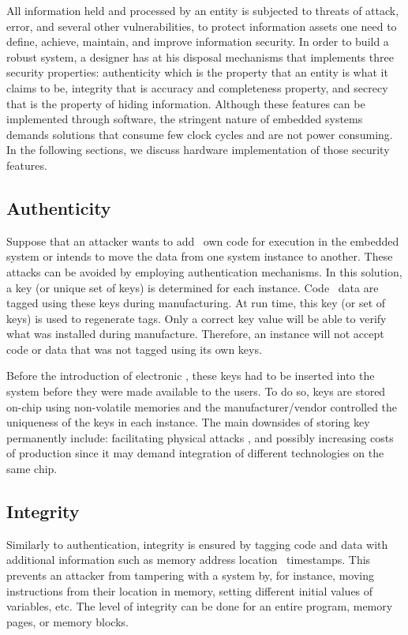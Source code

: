All information held and processed by an entity is subjected to threats of attack, error, and several other vulnerabilities, to protect information assets one need to define, achieve, maintain, and improve information security. In order to build a robust system, a designer has at his disposal mechanisms that implements three security properties: authenticity which is the property that an entity is what it claims to be, integrity that is accuracy and completeness property, and secrecy that is the property of hiding information. Although these features can be implemented through software, the stringent nature of embedded systems demands solutions that consume few clock cycles and are not power consuming.
In the following sections, we discuss hardware implementation of those security features.


\subsection{Authenticity}
\label{subsec:Authenticity}
Suppose that an attacker wants to add \hisher~own code for execution in the embedded system or intends to move the data from one system instance to another. These attacks can be avoided by employing authentication mechanisms. In this solution, a key (or unique set of keys) is determined for each instance.
Code \andor~data are tagged using these keys during manufacturing.  At run time, this key (or set of keys) is used to regenerate tags. Only a correct key value will be able to verify what was installed during manufacture. Therefore, an instance will not accept code or data that was not tagged using its own keys.

Before the introduction of electronic \pufs \cite{Gassend2002:PUFs}, these keys had to be inserted into the system before they were made available to the users. To do so, keys are stored on-chip using non-volatile memories and the manufacturer\slash{}vendor controlled the uniqueness of the keys in each instance. The main downsides of storing key permanently include: facilitating physical attacks \cite{Sadeghi2010:Security-PUFs}, and possibly increasing costs of production since it may demand integration of different technologies on the same chip.

\subsection{Integrity}
\label{subsec:integrity}
Similarly to authentication, integrity is ensured by tagging code and data with additional information such as memory address location \andor~timestamps. This prevents an attacker from tampering with a system by, for instance, moving instructions from their location in memory, setting different initial values of variables, etc. The level of integrity can be done for an entire program, memory pages, or memory blocks. 

